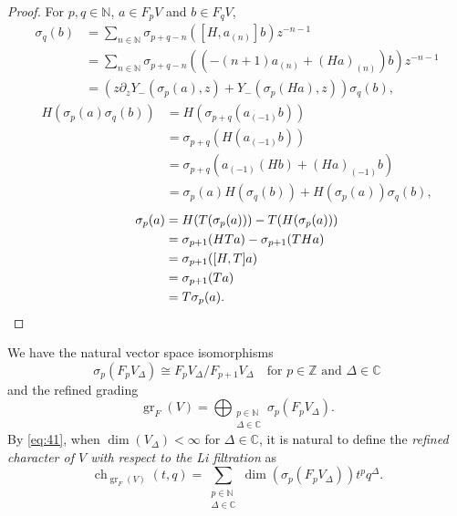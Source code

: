 \documentclass[a4paper, 12pt, reqno]{amsart}
\theoremstyle{remark}
\DeclareMathOperator{\gr}{gr}
\DeclareMathOperator{\ch}{ch}
\begin{document}
\begin{proof}
  For $p, q \in \mathbb{N}$, $a \in F_pV$ and $b \in F_qV$,
  \begin{align*}
    [H, Y_-(\sigma_p(a), z)]\sigma_q(b) &= \sum_{n \in \mathbb{N}}\sigma_{p + q - n}([H, a_{(n)}]b)z^{-n - 1} \\
                                        &= \sum_{n \in \mathbb{N}}\sigma_{p + q - n}((-(n + 1)a_{(n)} + (Ha)_{(n)})b)z^{-n - 1} \\
                                        &= (z\partial_zY_-(\sigma_p(a), z) + Y_-(\sigma_p(Ha), z))\sigma_q(b),
  \end{align*}
  \begin{align*}
    H(\sigma_p(a)\sigma_q(b)) &= H(\sigma_{p + q}(a_{(-1)}b)) \\
                              &= \sigma_{p + q}(H(a_{(-1)}b)) \\
                              &= \sigma_{p + q}(a_{(-1)}(Hb) + (Ha)_{(-1)}b) \\
                              &= \sigma_p(a)H(\sigma_q(b)) + H(\sigma_p(a))\sigma_q(b),
  \end{align*}
  \begin{align*}
    [H, T]\sigma_p(a) &= H(T(\sigma_p(a))) - T(H(\sigma_p(a))) \\
                      &= \sigma_{p + 1}(HTa) - \sigma_{p + 1}(THa) \\
                      &= \sigma_{p + 1}([H, T]a) \\
                      &= \sigma_{p + 1}(Ta) \\
                      &= T\sigma_p(a). \qedhere
  \end{align*}
\end{proof}

We have the natural vector space isomorphisms
\begin{equation*}
  \sigma_p(F_pV_{\Delta}) \cong F_pV_{\Delta}/F_{p + 1}V_{\Delta} \quad \text{for $p \in \mathbb{Z}$ and $\Delta \in \mathbb{C}$}
\end{equation*}
and the refined grading
\begin{equation}
  \label{eq:41}
  \gr_F(V) = \bigoplus_{\substack{p \in \mathbb{N} \\ \Delta \in \mathbb{C}}}\sigma_p(F_pV_{\Delta}).
\end{equation}
By \eqref{eq:41}, when $\dim(V_{\Delta}) < \infty$ for $\Delta \in \mathbb{C}$, it is natural to define the \emph{refined character of $V$ with respect to the Li filtration} as
\begin{equation*}
  \ch_{\gr_F(V)}(t, q) = \sum_{\substack{p \in \mathbb{N} \\ \Delta \in \mathbb{C}}}\dim(\sigma_p(F_pV_{\Delta}))t^pq^{\Delta}.
\end{equation*}
\end{document}
